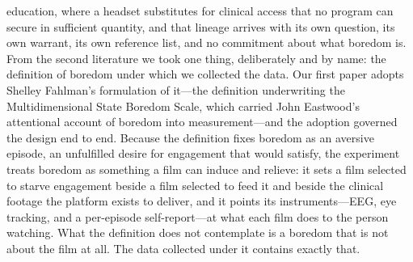 education, where a headset substitutes for clinical access that no program can secure in
sufficient quantity, and that lineage arrives with its own question, its own warrant, its own
reference list, and no commitment about what boredom is. From the second literature we took
one thing, deliberately and by name: the definition of boredom under which we collected the
data. Our first paper adopts Shelley Fahlman's formulation of it---the definition
underwriting the Multidimensional State Boredom Scale, which carried John Eastwood's
attentional account of boredom into measurement---and the adoption governed the design end to
end. Because the definition fixes boredom as an aversive episode, an unfulfilled desire for
engagement that would satisfy, the experiment treats boredom as something a film can induce
and relieve: it sets a film selected to starve engagement beside a film selected to feed it
and beside the clinical footage the platform exists to deliver, and it points its
instruments---EEG, eye tracking, and a per-episode self-report---at what each film does to
the person watching. What the definition does not contemplate is a boredom that is not about
the film at all. The data collected under it contains exactly that.

\begin{center}
\end{center}


